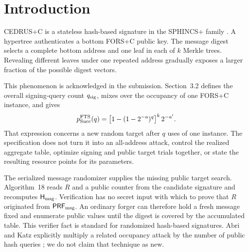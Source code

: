\documentclass[11pt,a4paper]{article}
\newcommand{\PRFmsg}{\ensuremath{\mathsf{PRF}_{\rm msg}}}
\newcommand{\Hmsg}{\ensuremath{\mathsf{H}_{\rm msg}}}
\begin{document}
\begin{abstract}
A scaled experiment under the strict repaired verifier produced an accepted
fresh-message forgery from ordinary randomized signatures and rejected seven
adversarial controls.
Separate native experiments using the untouched submitted FORS cores confirm
the full-parameter coordinate splice for 160f and 160s.  The attack uses a
strict, scheme-favourable interpretation of the full-width specification and
does not use reset, repeated randomness, deterministic signing, weak or
related keys, omitted WOTS checks, or the submitted source's tree-index
collapse.  The generic
FORS+C accumulation mechanism appears in CEDRUS+C Section~3.2, and public-hash
amplification appears in Abri--Katz.  Our claimed contribution is limited to
the CEDRUS+C parameter and lifetime consequence, rigorous all-address
concentration and sharding analysis, and complete resource accounting.
\end{abstract}

\section{Introduction}

CEDRUS+C is a stateless hash-based signature in the SPHINCS+ family
\cite{cedrus-spec,sphincsc}.  A hypertree authenticates a bottom FORS+C public
key.  The message digest selects a complete bottom address and one leaf in each
of $k$ Merkle trees.  Revealing different leaves under one repeated address
gradually exposes a larger fraction of the possible digest vectors.

This phenomenon is acknowledged in the submission.  Section~3.2 defines the
overall signing-query count $q_{\rm sig}$, mixes over the occupancy of one
FORS+C instance, and gives
\begin{equation}
 p^{\rm FTS}_{\rm Succ}(q)=
 \left[1-(1-2^{-a})^q\right]^k2^{-a'} .              \label{eq:submitted}
\end{equation}
That expression concerns a new random target after $q$ uses of one instance.
The specification does not turn it into an all-address attack, control the
realized aggregate table, optimize signing and public target trials together,
or state the resulting resource points for its parameters.

The serialized message randomizer supplies the missing public target search.
Algorithm~18 reads $R$ and a public counter from the candidate signature and
recomputes $\Hmsg$.  Verification has no secret input with which to prove that
$R$ originated from $\PRFmsg$.  An ordinary forger can therefore hold a fresh
message fixed and enumerate public values until the digest is covered by the
accumulated table.  This verifier fact is standard for randomized hash-based
signatures.  Abri and Katz explicitly multiply a related occupancy attack by
the number of public hash queries \cite[Eq.~(2)]{abri-katz}; we do not claim
that technique as new.
\end{document}
